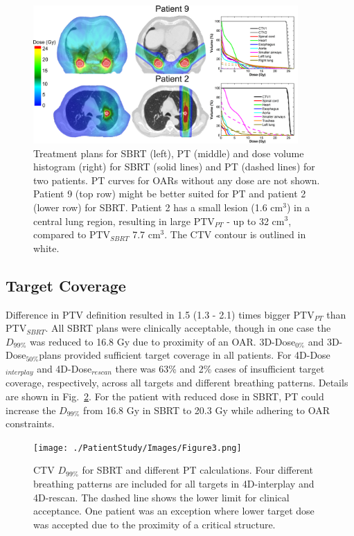 \begin{figure}[H]
\begin{center}
\includegraphics[width=0.9\textwidth]{./PatientStudy/Images/Figure2.png}
\caption{Treatment plans for SBRT (left), PT (middle) and dose volume histogram (right) for SBRT (solid lines) and PT (dashed lines) for two patients. PT curves for OARs without any dose are not shown. Patient 9 (top row) might be better suited for PT and patient 2 (lower row) for SBRT. Patient 2 has a small lesion (1.6 cm$^{3}$) in a central lung region, resulting in large PTV$_{PT}$ - up to 32 cm$^{3}$, compared to PTV$_{SBRT}$ 7.7 cm$^{3}$. The CTV contour is outlined in white.}
\label{Fig:TreatmentPlans}
\end{center}
\end{figure}

\subsection{Target Coverage}

Difference in PTV definition resulted in 1.5 (1.3 - 2.1) times bigger PTV$_{PT}$ than PTV$_{SBRT}$. All SBRT plans were clinically acceptable, though in one case the $D_{99\%}$ was reduced to 16.8 Gy due to proximity of an OAR. 3D-Dose$_{0\%}$ and 3D-Dose$_{50\%}$plans provided sufficient target coverage in all patients. For 4D-Dose$_{interplay}$ and 4D-Dose$_{rescan}$ there was 63\% and 2\% cases of insufficient target coverage, respectively, across all targets and different breathing patterns. Details are shown in Fig.~\ref{Fig:InterplayDiff}. For the patient with reduced dose in SBRT, PT could increase the $D_{99\%}$ from 16.8 Gy in SBRT to 20.3 Gy while adhering to OAR constraints. 


\begin{figure}[H]
\begin{center}
\texttt{[image: ./PatientStudy/Images/Figure3.png]}
\caption{CTV $D_{99\%}$ for SBRT and different PT calculations. Four different breathing patterns are included for all targets in 4D-interplay and 4D-rescan. The dashed line shows the lower limit for clinical acceptance. One patient was an exception where lower target dose was accepted due to the proximity of a critical structure.  }
\label{Fig:InterplayDiff}
\end{center}
\end{figure}
\newpage
